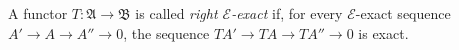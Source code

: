 A functor $T : \mathfrak{A} \to \mathfrak{B}$ is called \textit{right $\mathcal{E}$-exact} if, for every $\mathcal{E}$-exact sequence $A' \to A \to A'' \to 0$, the sequence $TA' \to TA \to TA'' \to 0$ is exact.